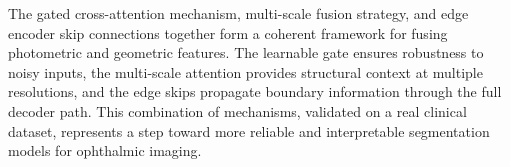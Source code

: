 The gated cross-attention mechanism, multi-scale fusion strategy, and edge encoder skip connections together form a coherent framework for fusing photometric and geometric features. The learnable gate ensures robustness to noisy inputs, the multi-scale attention provides structural context at multiple resolutions, and the edge skips propagate boundary information through the full decoder path. This combination of mechanisms, validated on a real clinical dataset, represents a step toward more reliable and interpretable segmentation models for ophthalmic imaging.

